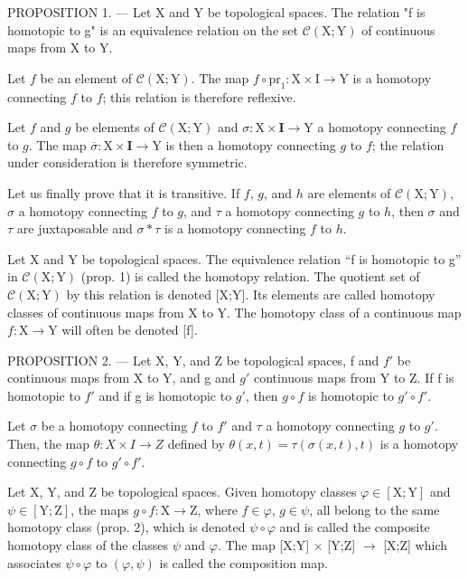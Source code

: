 PROPOSITION 1. --- Let X and Y be topological spaces. The relation "f is homotopic to g" is an equivalence relation on the set \(\mathcal{C}(\mathrm{X};\mathrm{Y})\) of continuous maps from X to Y.

Let \(f\) be an element of \(\mathcal{C}(\mathrm{X};\mathrm{Y})\). The map \(f\circ\mathrm{pr}_{1}\colon\mathrm{X}\times\mathrm{I}\to\mathrm{Y}\) is a homotopy connecting \(f\) to \(f\); this relation is therefore reflexive.

Let \(f\) and \(g\) be elements of \(\mathcal{C}(\mathrm{X};\mathrm{Y})\) and \(\sigma\colon\mathrm{X}\times\mathbf{I}\to\mathrm{Y}\) a homotopy connecting \(f\) to \(g\). The map \(\overline{\sigma}\colon\mathrm{X}\times\mathbf{I}\to\mathrm{Y}\) is then a homotopy connecting \(g\) to \(f\); the relation under consideration is therefore symmetric.

Let us finally prove that it is transitive. If \(f\), \(g\), and \(h\) are elements of \(\mathcal{C}(\mathrm{X};\mathrm{Y})\), \(\sigma\) a homotopy connecting \(f\) to \(g\), and \(\tau\) a homotopy connecting \(g\) to \(h\), then \(\sigma\) and \(\tau\) are juxtaposable and \(\sigma*\tau\) is a homotopy connecting \(f\) to \(h\).

Let X and Y be topological spaces. The equivalence relation “f is homotopic to g” in \(\mathcal{C}(\mathrm{X};\mathrm{Y})\) (prop. 1) is called the homotopy relation. The quotient set of \(\mathcal{C}(\mathrm{X};\mathrm{Y})\) by this relation is denoted {[}X;Y{]}. Its elements are called homotopy classes of continuous maps from X to Y. The homotopy class of a continuous map \(f\colon \mathrm{X}\to \mathrm{Y}\) will often be denoted {[}f{]}.

PROPOSITION 2. — Let X, Y, and Z be topological spaces, f and \(f'\) be continuous maps from X to Y, and g and \(g'\) continuous maps from Y to Z. If f is homotopic to \(f'\) and if g is homotopic to \(g'\), then \(g \circ f\) is homotopic to \(g' \circ f'\).

Let \(\sigma\) be a homotopy connecting \(f\) to \(f'\) and \(\tau\) a homotopy connecting \(g\) to \(g'\). Then, the map \(\theta\colon X\times I\to Z\) defined by \(\theta(x,t)=\tau(\sigma(x,t),t)\) is a homotopy connecting \(g\circ f\) to \(g'\circ f'\).

Let X, Y, and Z be topological spaces. Given homotopy classes \(\varphi \in [\mathrm{X};\mathrm{Y}]\) and \(\psi \in [\mathrm{Y};\mathrm{Z}]\), the maps \(g \circ f: \mathrm{X} \to \mathrm{Z}\), where \(f \in \varphi\), \(g \in \psi\), all belong to the same homotopy class (prop. 2), which is denoted \(\psi \circ \varphi\) and is called the composite homotopy class of the classes \(\psi\) and \(\varphi\). The map {[}X;Y{]} \(\times\) {[}Y;Z{]} \(\to\) {[}X;Z{]} which associates \(\psi \circ \varphi\) to \((\varphi,\psi)\) is called the composition map.

